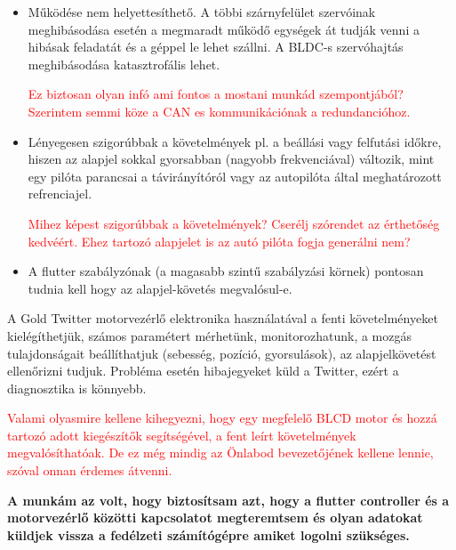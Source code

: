 \begin{itemize}
	\item Működése nem helyettesíthető. A többi szárnyfelület szervóinak meghibásodása esetén a megmaradt működő egységek át tudják venni a hibásak feladatát és a géppel le lehet szállni. A BLDC-s szervóhajtás meghibásodása katasztrofális lehet.
\begin{scriptsize}
    \textcolor{red}{Ez biztosan olyan infó ami fontos a mostani munkád szempontjából? Szerintem semmi köze a CAN es kommunikációnak a redundancióhoz.
}
\end{scriptsize}


	\item Lényegesen szigorúbbak a követelmények pl. a beállási vagy felfutási időkre, hiszen az alapjel sokkal gyorsabban (nagyobb frekvenciával) változik, mint egy pilóta parancsai a távirányítóról vagy az autopilóta által meghatározott refrenciajel.

\begin{scriptsize}
\textcolor{red}{Mihez képest szigorúbbak a követelmények? Cserélj szórendet az érthetőség kedvéért. Ehez tartozó alapjelet is az autó pilóta fogja generálni nem? 
}
\end{scriptsize}


	\item A flutter szabályzónak (a magasabb szintű szabályzási körnek) pontosan tudnia kell hogy az alapjel-követés megvalósul-e.  
\end{itemize}


A Gold Twitter motorvezérlő elektronika használatával a fenti követelményeket kielégíthetjük, számos paramétert mérhetünk, monitorozhatunk, a mozgás tulajdonságait beállíthatjuk (sebesség, pozíció, gyorsulások), az alapjelkövetést ellenőrizni tudjuk. Probléma esetén hibajegyeket küld a Twitter, ezért a diagnosztika is könnyebb.

\begin{scriptsize}
\textcolor{red}{Valami olyasmire kellene kihegyezni, hogy egy megfelelő BLCD motor és hozzá tartozó adott kiegészítők segítségével, a fent leírt követelmények megvalósíthatóak. De ez még mindig az Önlabod bevezetőjének kellene lennie, szóval onnan érdemes átvenni.
}
\end{scriptsize}



\textbf{A munkám az volt, hogy biztosítsam azt, hogy a flutter controller és a motorvezérlő közötti kapcsolatot megteremtsem és olyan adatokat küldjek vissza a fedélzeti számítógépre amiket logolni szükséges.}

